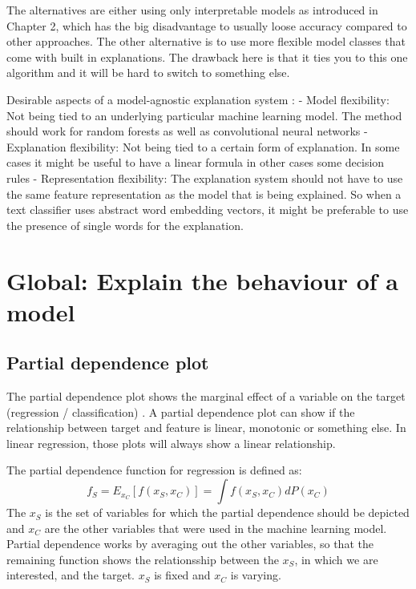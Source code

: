 \documentclass[12pt,]{krantz}
\theoremstyle{definition}
\theoremstyle{definition}
\theoremstyle{definition}
\theoremstyle{remark}
\begin{document}
The alternatives are either using only interpretable models as
introduced in Chapter 2, which has the big disadvantage to usually loose
accuracy compared to other approaches. The other alternative is to use
more flexible model classes that come with built in explanations. The
drawback here is that it ties you to this one algorithm and it will be
hard to switch to something else.

Desirable aspects of a model-agnostic explanation system
\citep{Ribeiro2016b}: - Model flexibility: Not being tied to an
underlying particular machine learning model. The method should work for
random forests as well as convolutional neural networks - Explanation
flexibility: Not being tied to a certain form of explanation. In some
cases it might be useful to have a linear formula in other cases some
decision rules - Representation flexibility: The explanation system
should not have to use the same feature representation as the model that
is being explained. So when a text classifier uses abstract word
embedding vectors, it might be preferable to use the presence of single
words for the explanation.

\section{Global: Explain the behaviour of a
model}\label{global-explain-the-behaviour-of-a-model}

\subsection{Partial dependence plot}\label{pdp}

The partial dependence plot shows the marginal effect of a variable on
the target (regression / classification) \citep{friedman2001greedy}. A
partial dependence plot can show if the relationship between target and
feature is linear, monotonic or something else. In linear regression,
those plots will always show a linear relationship.

The partial dependence function for regression is defined as:
\[f_S = E_{x_C}[f(x_S, x_C)] = \int f(x_S, x_C) dP(x_C)\] The \(x_S\) is
the set of variables for which the partial dependence should be depicted
and \(x_C\) are the other variables that were used in the machine
learning model. Partial dependence works by averaging out the other
variables, so that the remaining function shows the relationsship
between the \(x_S\), in which we are interested, and the target. \(x_S\)
is fixed and \(x_C\) is varying.
\end{document}
